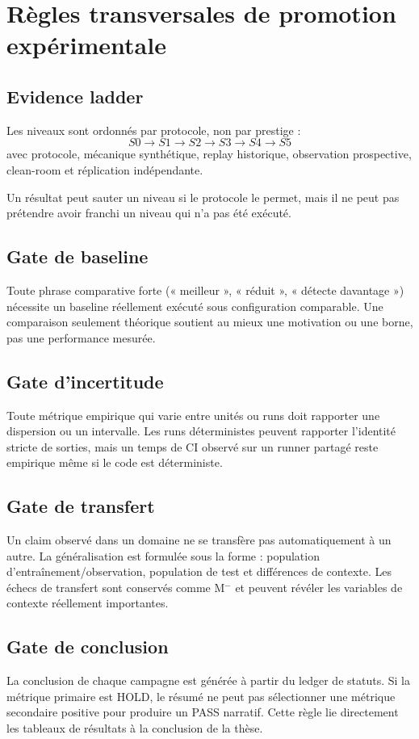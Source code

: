 \chapter{Règles transversales de promotion expérimentale}

\section{Evidence ladder}

Les niveaux sont ordonnés par protocole, non par prestige :
\[
S0\to S1\to S2\to S3\to S4\to S5
\]
avec protocole, mécanique synthétique, replay historique, observation prospective, clean-room et réplication indépendante.

Un résultat peut sauter un niveau si le protocole le permet, mais il ne peut pas prétendre avoir franchi un niveau qui n'a pas été exécuté.

\section{Gate de baseline}

Toute phrase comparative forte (« meilleur », « réduit », « détecte davantage ») nécessite un baseline réellement exécuté sous configuration comparable. Une comparaison seulement théorique soutient au mieux une motivation ou une borne, pas une performance mesurée.

\section{Gate d'incertitude}

Toute métrique empirique qui varie entre unités ou runs doit rapporter une dispersion ou un intervalle. Les runs déterministes peuvent rapporter l'identité stricte de sorties, mais un temps de CI observé sur un runner partagé reste empirique même si le code est déterministe.

\section{Gate de transfert}

Un claim observé dans un domaine ne se transfère pas automatiquement à un autre. La généralisation est formulée sous la forme : population d'entraînement/observation, population de test et différences de contexte. Les échecs de transfert sont conservés comme M$^-$ et peuvent révéler les variables de contexte réellement importantes.

\section{Gate de conclusion}

La conclusion de chaque campagne est générée à partir du ledger de statuts. Si la métrique primaire est HOLD, le résumé ne peut pas sélectionner une métrique secondaire positive pour produire un PASS narratif. Cette règle lie directement les tableaux de résultats à la conclusion de la thèse.
